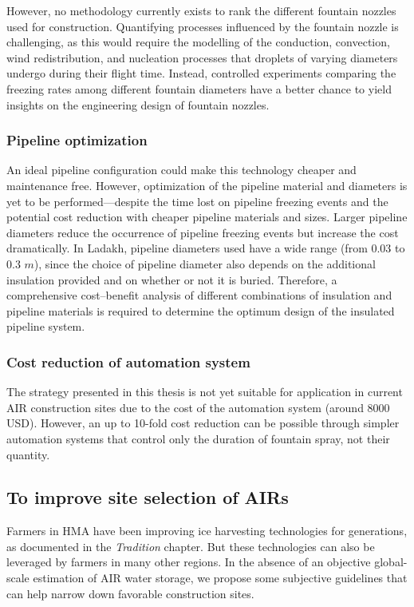 However, no methodology currently exists to rank the different fountain nozzles used for construction. Quantifying
processes influenced by the fountain nozzle is challenging, as this would require the modelling of the conduction,
convection, wind redistribution, and nucleation processes that droplets of varying diameters undergo during
their flight time. Instead, controlled experiments comparing the freezing rates among different fountain
diameters have a better chance to yield insights on the engineering design of fountain nozzles.

\subsubsection{Pipeline optimization}

An ideal pipeline configuration could make this technology cheaper and maintenance free. However, optimization
of the pipeline material and diameters is yet to be performed---despite the time lost on pipeline freezing
events and the potential cost reduction with cheaper pipeline materials and sizes. Larger pipeline diameters
reduce the occurrence of pipeline freezing events but increase the cost dramatically. In Ladakh, pipeline
diameters used have a wide range (from 0.03 to 0.3 $m$), since the choice of pipeline diameter also depends on
the additional insulation provided and on whether or not it is buried. Therefore, a comprehensive cost--benefit
analysis of different combinations of insulation and pipeline materials is required to determine the optimum
design of the insulated pipeline system.

\subsubsection{Cost reduction of automation system}

The strategy presented in this thesis is not yet suitable for application in current \ac{AIR} construction sites
due to the cost of the automation system (around 8000 USD). However, an up to 10-fold cost reduction can be
possible through simpler automation systems that control only the duration of fountain spray, not their
quantity. 

\subsection{To improve site selection of AIRs }

Farmers in \ac{HMA} have been improving ice harvesting technologies for generations, as documented in the
\textit{Tradition} chapter. But these technologies can also be leveraged by farmers in many other regions. In the
absence of an objective global-scale estimation of \ac{AIR} water storage, we propose some subjective guidelines
that can help narrow down favorable construction sites.

